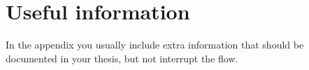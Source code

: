 \chapter{Useful information}
\label{sec:app}

In the appendix you usually include extra information that should be
documented in your thesis, but not interrupt the flow.
